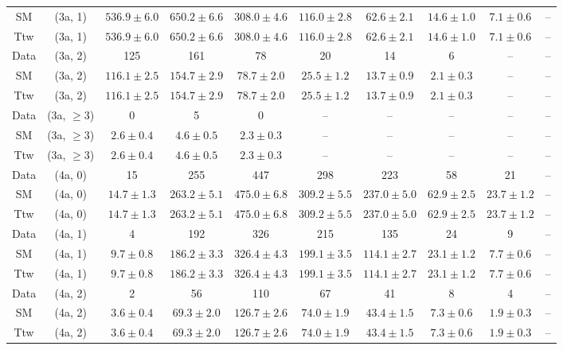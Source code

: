 \begin{table}[h!]
{\begin{tabular}{cccccccccc}
	SM & (3a, 1) & $536.9\pm 6.0$ & $650.2\pm 6.6$ & $308.0\pm 4.6$ & $116.0\pm 2.8$ & $62.6\pm 2.1$ & $14.6\pm 1.0$ & $7.1\pm 0.6$ & -- \\[0.5ex] 
	Ttw & (3a, 1) & $536.9\pm 6.0$ & $650.2\pm 6.6$ & $308.0\pm 4.6$ & $116.0\pm 2.8$ & $62.6\pm 2.1$ & $14.6\pm 1.0$ & $7.1\pm 0.6$ & -- \\[0.5ex] 
	Data & (3a, 2) & 125 & 161 & 78 & 20 & 14 & 6 & -- & -- \\[0.5ex] 
	SM & (3a, 2) & $116.1\pm 2.5$ & $154.7\pm 2.9$ & $78.7\pm 2.0$ & $25.5\pm 1.2$ & $13.7\pm 0.9$ & $2.1\pm 0.3$ & -- & -- \\[0.5ex] 
	Ttw & (3a, 2) & $116.1\pm 2.5$ & $154.7\pm 2.9$ & $78.7\pm 2.0$ & $25.5\pm 1.2$ & $13.7\pm 0.9$ & $2.1\pm 0.3$ & -- & -- \\[0.5ex] 
	Data & (3a, $\ge3$) & 0 & 5 & 0 & -- & -- & -- & -- & -- \\[0.5ex] 
	SM & (3a, $\ge3$) & $2.6\pm 0.4$ & $4.6\pm 0.5$ & $2.3\pm 0.3$ & -- & -- & -- & -- & -- \\[0.5ex] 
	Ttw & (3a, $\ge3$) & $2.6\pm 0.4$ & $4.6\pm 0.5$ & $2.3\pm 0.3$ & -- & -- & -- & -- & -- \\[0.5ex] 
	Data & (4a, 0) & 15 & 255 & 447 & 298 & 223 & 58 & 21 & -- \\[0.5ex] 
	SM & (4a, 0) & $14.7\pm 1.3$ & $263.2\pm 5.1$ & $475.0\pm 6.8$ & $309.2\pm 5.5$ & $237.0\pm 5.0$ & $62.9\pm 2.5$ & $23.7\pm 1.2$ & -- \\[0.5ex] 
	Ttw & (4a, 0) & $14.7\pm 1.3$ & $263.2\pm 5.1$ & $475.0\pm 6.8$ & $309.2\pm 5.5$ & $237.0\pm 5.0$ & $62.9\pm 2.5$ & $23.7\pm 1.2$ & -- \\[0.5ex] 
	Data & (4a, 1) & 4 & 192 & 326 & 215 & 135 & 24 & 9 & -- \\[0.5ex] 
	SM & (4a, 1) & $9.7\pm 0.8$ & $186.2\pm 3.3$ & $326.4\pm 4.3$ & $199.1\pm 3.5$ & $114.1\pm 2.7$ & $23.1\pm 1.2$ & $7.7\pm 0.6$ & -- \\[0.5ex] 
	Ttw & (4a, 1) & $9.7\pm 0.8$ & $186.2\pm 3.3$ & $326.4\pm 4.3$ & $199.1\pm 3.5$ & $114.1\pm 2.7$ & $23.1\pm 1.2$ & $7.7\pm 0.6$ & -- \\[0.5ex] 
	Data & (4a, 2) & 2 & 56 & 110 & 67 & 41 & 8 & 4 & -- \\[0.5ex] 
	SM & (4a, 2) & $3.6\pm 0.4$ & $69.3\pm 2.0$ & $126.7\pm 2.6$ & $74.0\pm 1.9$ & $43.4\pm 1.5$ & $7.3\pm 0.6$ & $1.9\pm 0.3$ & -- \\[0.5ex] 
	Ttw & (4a, 2) & $3.6\pm 0.4$ & $69.3\pm 2.0$ & $126.7\pm 2.6$ & $74.0\pm 1.9$ & $43.4\pm 1.5$ & $7.3\pm 0.6$ & $1.9\pm 0.3$ & -- \\[0.5ex] 

\end{tabular}}
\end{table}
